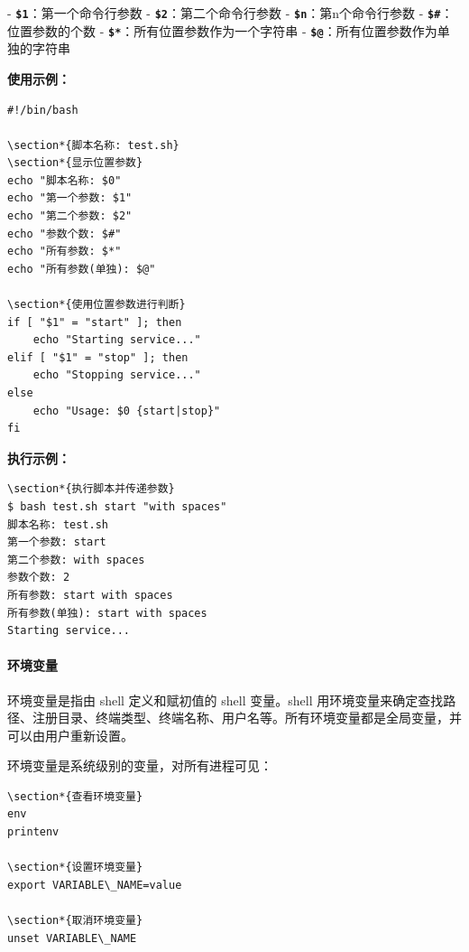 \documentclass[12pt,UTF8]{ctexbook}
\begin{document}
- \textbf{\texttt{\$1}}：第一个命令行参数
- \textbf{\texttt{\$2}}：第二个命令行参数
- \textbf{\texttt{\$n}}：第n个命令行参数
- \textbf{\texttt{\$\#}}：位置参数的个数
- \textbf{\texttt{\$*}}：所有位置参数作为一个字符串
- \textbf{\texttt{\$@}}：所有位置参数作为单独的字符串

\textbf{使用示例：}
\begin{verbatim}
#!/bin/bash

\section*{脚本名称: test.sh}
\section*{显示位置参数}
echo "脚本名称: $0"
echo "第一个参数: $1"
echo "第二个参数: $2"
echo "参数个数: $#"
echo "所有参数: $*"
echo "所有参数(单独): $@"

\section*{使用位置参数进行判断}
if [ "$1" = "start" ]; then
    echo "Starting service..."
elif [ "$1" = "stop" ]; then
    echo "Stopping service..."
else
    echo "Usage: $0 {start|stop}"
fi
\end{verbatim}

\textbf{执行示例：}
\begin{verbatim}
\section*{执行脚本并传递参数}
$ bash test.sh start "with spaces"
脚本名称: test.sh
第一个参数: start
第二个参数: with spaces
参数个数: 2
所有参数: start with spaces
所有参数(单独): start with spaces
Starting service...
\end{verbatim}

\paragraph{环境变量}
环境变量是指由 shell 定义和赋初值的 shell 变量。shell 用环境变量来确定查找路径、注册目录、终端类型、终端名称、用户名等。所有环境变量都是全局变量，并可以由用户重新设置。

环境变量是系统级别的变量，对所有进程可见：
\begin{verbatim}
\section*{查看环境变量}
env
printenv

\section*{设置环境变量}
export VARIABLE\_NAME=value

\section*{取消环境变量}
unset VARIABLE\_NAME
\end{verbatim}
\end{document}
